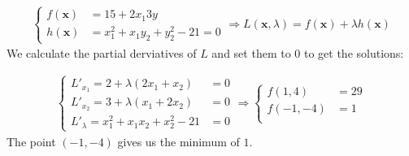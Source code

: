 \documentclass{article}
\begin{document}
\subsubsection{}

\begin{align*}
  \begin{cases}
    f(\mathbf{x}) &= 15 + 2x_1  3y \\
    h(\mathbf{x}) &= x_1^2 + x_1y_2 + y_2^2 - 21 = 0
  \end{cases}
  \Rightarrow
  L(\mathbf{x}, \lambda) = f(\mathbf{x}) + \lambda h(\mathbf{x})
\end{align*}
We calculate the partial derviatives of $L$ and set them to $0$ to get the solutions:

\begin{align*}
  \begin{cases}
    L'_{x_1} = 2 + \lambda (2x_1 + x_2) &= 0 \\
    L'_{x_2} = 3 + \lambda (x_1 + 2x_2) &= 0 \\
    L'_{\lambda} = x_1^2 + x_1 x_2 + x_2^2 - 21 &= 0
  \end{cases}
  \Rightarrow
  \begin{cases}
    f(1, 4) &= 29 \\
    f(-1, -4) &= 1 \\
  \end{cases}
\end{align*}
The point $(-1, -4)$ gives us the minimum of $1$.

\subsection{}
\end{document}

